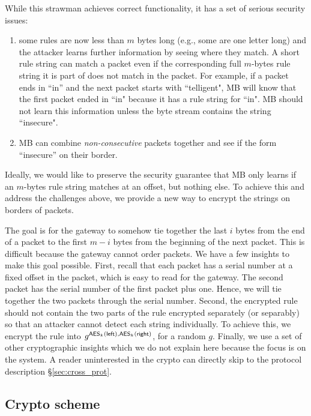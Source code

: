  While this strawman achieves correct functionality, it has a set of serious security issues:
 \begin{enumerate}
 \item some rules are now less than $m$ bytes long (e.g., some are one letter long) and the attacker learns further information by seeing where they match. A short rule string can match a packet even if the corresponding full $m$-bytes rule string it is part of does not match in the packet. For example, if a packet ends in ``in'' and the next packet starts with ``telligent", MB will know that the first packet ended in ``in" because it has a rule string for ``in". MB should not learn this information unless the byte stream contains the string ``insecure". 

 \item MB can combine {\em non-consecutive} packets together and see if the form ``insecure'' on their border.
 \end{enumerate}
 
 Ideally, we would like to preserve the security guarantee that MB only learns if an $m$-bytes rule string matches at an offset, but nothing else. To achieve this and address the challenges above, we provide a new way to encrypt the strings on borders of packets. 
 
 The goal is for the gateway to somehow tie together the last $i$ bytes from the end of a packet to the first $m-i$ bytes from the beginning of the next packet. This is difficult because the gateway cannot order packets. We have a few insights to make this goal possible. First, recall that each packet has a serial number at a fixed offset in the packet, which is easy to read for the gateway. The second packet has the serial number of the first packet plus one. Hence, we will tie together the two packets through the serial number. Second, the encrypted rule should not contain the two parts of the rule encrypted separately (or separably) so that an attacker cannot detect each string individually. To achieve this, we encrypt the rule into $g^{\mathsf{AES}_k(\mathsf{left}), \mathsf{AES}_k(\mathsf{right})}$, for a random $g$. Finally, we use a set of other cryptographic insights which we do not explain here because the focus is on the system. A reader uninterested in the crypto can directly skip to the protocol description \S\ref{sec:cross_prot}. 
 
 \subsection{Crypto scheme}
 
